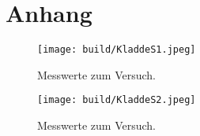 \section{Anhang}\label{sec:Anhang}
\begin{figure}[H]
   \centering
    \texttt{[image: build/KladdeS1.jpeg]}
   \caption{Messwerte zum Versuch.}
\end{figure}
\begin{figure}[H]
    \centering
     \texttt{[image: build/KladdeS2.jpeg]}
    \caption{Messwerte zum Versuch.}
 \end{figure}
\pagebreak